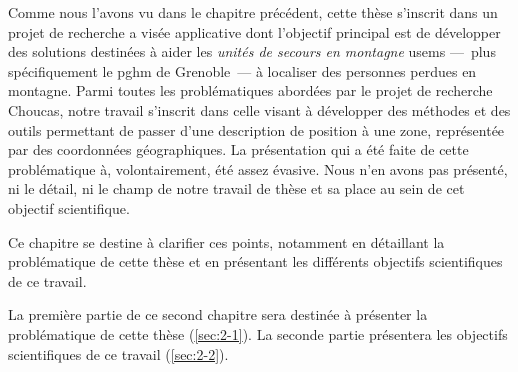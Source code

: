 Comme nous l'avons vu dans le chapitre précédent, cette thèse
s'inscrit dans un projet de recherche a visée applicative dont
l'objectif principal est de développer des solutions destinées à aider
les \emph{unités de secours en montagne} \acp{usem} ---~plus
spécifiquement le \ac{pghm} de Grenoble~--- à localiser des personnes
perdues en montagne. Parmi toutes les problématiques abordées par le
projet de recherche Choucas, notre travail s'inscrit dans celle visant
à développer des méthodes et des outils permettant de passer d'une
description de position à une zone, représentée par des coordonnées
géographiques. La présentation qui a été faite de cette problématique
à, volontairement, été assez évasive. Nous n'en avons pas présenté, ni
le détail, ni le champ de notre travail de thèse et sa place au sein
de cet objectif scientifique.

Ce chapitre se destine à clarifier ces points, notamment en détaillant
la problématique de cette thèse et en présentant les différents
objectifs scientifiques de ce travail. 

La première partie de ce second chapitre sera destinée à présenter la
problématique de cette thèse (\autoref{sec:2-1}). La seconde partie
présentera les objectifs scientifiques de ce travail
(\autoref{sec:2-2}).

